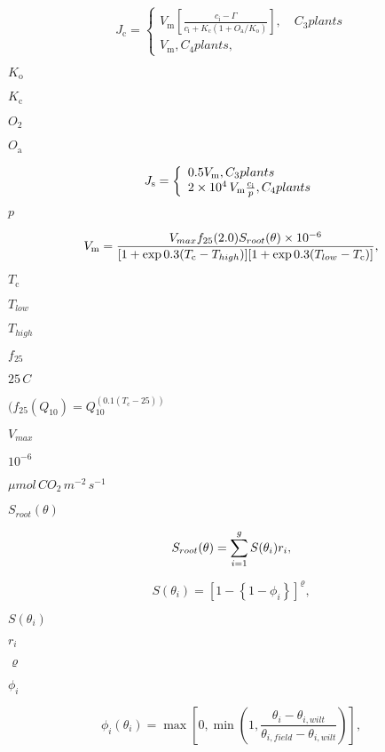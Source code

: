 \documentclass{article}
\begin{document}
{\[ \label{J_c} J_\mathrm{c} = \begin{cases} V_\mathrm{m} \left[\frac{c_\mathrm{i} - \Gamma}{c_\mathrm{i} + K_\mathrm{c}(1 + O_\mathrm{a}/K_\mathrm{o})}\right],\quad C_3 plants\\ V_\mathrm{m}, C_4 plants, \end{cases} \]
\pagebreak

$K_\mathrm{o}$
\pagebreak

$K_\mathrm{c}$
\pagebreak

$O_2$
\pagebreak

$O_\mathrm{a}$
\pagebreak

\[ \label{J_s} J_\mathrm{s} = \left\{\begin{array}{l l} 0.5 V_\mathrm{m}, C_3 plants\\ 2 \times 10^4\,V_\mathrm{m} \frac{c_\mathrm{i}}{p}, C_4 plants \end{array} \right. \]
\pagebreak

$p$
\pagebreak

\[ V_\mathrm{m} = \nonumber \\ \frac{V_{max}f_{25}(2.0)S_{root}(\theta) \times 10^{-6}} {[1+ \exp{0.3(T_\mathrm{c} - T_{high})}][1 + \exp{0.3(T_{low} - T_\mathrm{c})}]},\label{V_m} \]
\pagebreak

$T_\mathrm{c}$
\pagebreak

$T_{low}$
\pagebreak

$T_{high}$
\pagebreak

$f_{25}$
\pagebreak

$25\,C$
\pagebreak

$(f_{25}(Q_{10}) = Q^{(0.1(T_\mathrm{c}-25))}_{10}$
\pagebreak

$V_{max}$
\pagebreak

$10^{-6}$
\pagebreak

${\mu}mol\,CO_2\,m^{-2}\,s^{-1}$
\pagebreak

$S_{root}(\theta)$
\pagebreak

\[ S_{root}(\theta) = \sum_{i=1}^g S(\theta_i) r_{i}, \vspace*{-4mm} \]
\pagebreak

\[ \label{soilmoist_str} S(\theta_i) = \left[1 - \left\{1 - \phi_i \right\}\right]^\varrho, \]
\pagebreak

$S(\theta_i)$
\pagebreak

$r_{i}$
\pagebreak

$\varrho$
\pagebreak

$\phi_i$
\pagebreak

\[ \label{phitheta} \phi_{i}(\theta_{i}) = \max \left[0, \min \left(1, \frac{\theta_{i} - \theta_{i, wilt}}{\theta_{i, field} - \theta_{i, wilt}} \right) \right], \]
\pagebreak

}
\end{document}
